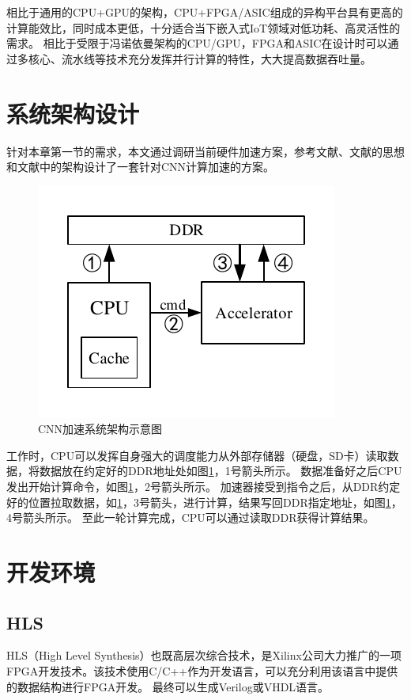         相比于通用的CPU+GPU的架构，CPU+FPGA/ASIC组成的异构平台具有更高的计算能效比，同时成本更低，十分适合当下嵌入式IoT领域对低功耗、高灵活性的需求。
        相比于受限于冯诺依曼架构的CPU/GPU，FPGA和ASIC在设计时可以通过多核心、流水线等技术充分发挥并行计算的特性，大大提高数据吞吐量。

\section{系统架构设计}
    针对本章第一节的需求，本文通过调研当前硬件加速方案，参考文献\cite{chen2017eyeriss}、文献\cite{chen2016eyeriss}的思想和文献\cite{sun2018high}中的架构设计了一套针对CNN计算加速的方案。
    \begin{figure}[h]
        \centering
        \includegraphics{../pdf/system.pdf}
        \caption{CNN加速系统架构示意图}
        \label{sys}
    \end{figure}
    工作时，CPU可以发挥自身强大的调度能力从外部存储器（硬盘，SD卡）读取数据，将数据放在约定好的DDR地址处如图\ref{sys}，1号箭头所示。
    数据准备好之后CPU发出开始计算命令，如图\ref{sys}，2号箭头所示。
    加速器接受到指令之后，从DDR约定好的位置拉取数据，如\ref{sys}，3号箭头，进行计算，结果写回DDR指定地址，如图\ref{sys}，4号箭头所示。
    至此一轮计算完成，CPU可以通过读取DDR获得计算结果。

\section{开发环境}
    \subsection{HLS}
    HLS（High Level Synthesis）也既高层次综合技术，是Xilinx公司大力推广的一项FPGA开发技术。该技术使用C/C++作为开发语言，可以充分利用该语言中提供的数据结构进行FPGA开发。
    最终可以生成Verilog或VHDL语言。


